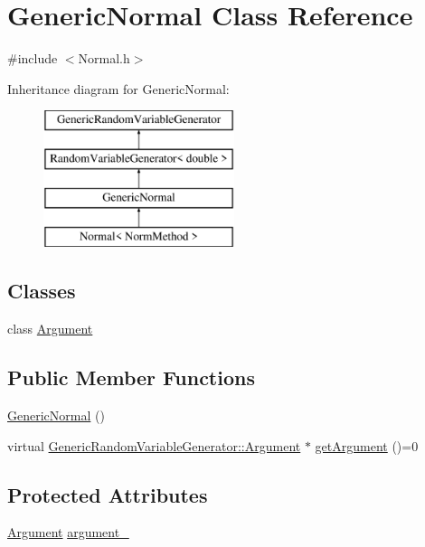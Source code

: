 \hypertarget{class_generic_normal}{}\section{Generic\+Normal Class Reference}
\label{class_generic_normal}


{\ttfamily \#include $<$Normal.\+h$>$}

Inheritance diagram for Generic\+Normal\+:\begin{figure}[H]
\begin{center}
\leavevmode
\includegraphics[height=4.000000cm]{class_generic_normal}
\end{center}
\end{figure}
\subsection*{Classes}
\begin{DoxyCompactItemize}
\item 
class \hyperlink{class_generic_normal_1_1_argument}{Argument}
\end{DoxyCompactItemize}
\subsection*{Public Member Functions}
\begin{DoxyCompactItemize}
\item 
\hyperlink{class_generic_normal_ae835b7fa40969da5cab6425fb6a12a26}{Generic\+Normal} ()
\item 
virtual \hyperlink{class_generic_random_variable_generator_1_1_argument}{Generic\+Random\+Variable\+Generator\+::\+Argument} $\ast$ \hyperlink{class_generic_normal_a3006d271c692bc02b64b538342592e4d}{get\+Argument} ()=0
\end{DoxyCompactItemize}
\subsection*{Protected Attributes}
\begin{DoxyCompactItemize}
\item 
\hyperlink{class_generic_normal_1_1_argument}{Argument} \hyperlink{class_generic_normal_a9fe590cf9e7fd6693a040b513b3e58d2}{argument\+\_\+}
\end{DoxyCompactItemize}


